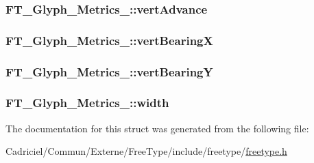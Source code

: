 \hypertarget{struct_f_t___glyph___metrics___a594f43c64fe5c12a399a0f0a47c04990}{
\subsubsection[{vert\-Advance}]{ F\-T\-\_\-\-Glyph\-\_\-\-Metrics\-\_\-\-::vert\-Advance}}\label{struct_f_t___glyph___metrics___a594f43c64fe5c12a399a0f0a47c04990}
\hypertarget{struct_f_t___glyph___metrics___aead5c5637b983b811738bff3bcea8cea}{
\subsubsection[{vert\-Bearing\-X}]{ F\-T\-\_\-\-Glyph\-\_\-\-Metrics\-\_\-\-::vert\-Bearing\-X}}\label{struct_f_t___glyph___metrics___aead5c5637b983b811738bff3bcea8cea}
\hypertarget{struct_f_t___glyph___metrics___a7f1aba91b86fddeb11030eab15dcce08}{
\subsubsection[{vert\-Bearing\-Y}]{ F\-T\-\_\-\-Glyph\-\_\-\-Metrics\-\_\-\-::vert\-Bearing\-Y}}\label{struct_f_t___glyph___metrics___a7f1aba91b86fddeb11030eab15dcce08}
\hypertarget{struct_f_t___glyph___metrics___a0ff1be869e6a28d1f2990b0e5719dca9}{
\subsubsection[{width}]{ F\-T\-\_\-\-Glyph\-\_\-\-Metrics\-\_\-\-::width}}\label{struct_f_t___glyph___metrics___a0ff1be869e6a28d1f2990b0e5719dca9}


The documentation for this struct was generated from the following file\-:\begin{DoxyCompactItemize}
\item 
Cadriciel/\-Commun/\-Externe/\-Free\-Type/include/freetype/\hyperlink{freetype_8h}{freetype.\-h}\end{DoxyCompactItemize}
